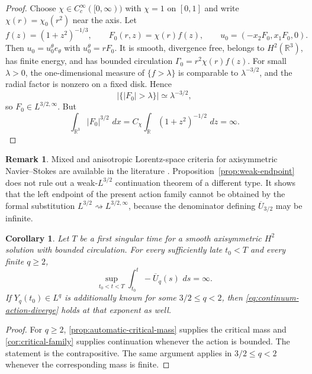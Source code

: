 \documentclass[11pt]{article}
\numberwithin{equation}{section}
\newtheorem{corollary}[corollary]{Corollary}
\theoremstyle{definition}
\newtheorem{remark}[remark]{Remark}
\newcommand{\R}{\mathbb R}
\newcommand{\dd}{\,d}
\begin{document}
\begin{proof}
Choose $\chi\in C_c^\infty([0,\infty))$ with $\chi=1$ on $[0,1]$ and write $\chi(r)=\chi_0(r^2)$ near the axis.  Let
\[
 f(z)=(1+z^2)^{-1/3},
 \qquad
 F_0(r,z)=\chi(r)f(z),
 \qquad
 u_0=(-x_2F_0,x_1F_0,0).
\]
Then $u_0=u_0^\theta e_\theta$ with $u_0^\theta=rF_0$.  It is smooth, divergence free, belongs to $H^2(\R^3)$, has finite energy, and has bounded circulation $\Gamma_0=r^2\chi(r)f(z)$.  For small $\lambda>0$, the one-dimensional measure of $\{f>\lambda\}$ is comparable to $\lambda^{-3/2}$, and the radial factor is nonzero on a fixed disk.  Hence
\[
 |\{|F_0|>\lambda\}|\simeq\lambda^{-3/2},
\]
so $F_0\in L^{3/2,\infty}$.  But
\[
 \int_{\R^3}|F_0|^{3/2}\,\dd x
 =C_\chi\int_\R(1+z^2)^{-1/2}\,\dd z=\infty.
\]
\end{proof}

\begin{remark}\label{rem:lorentz-scope}
Mixed and anisotropic Lorentz-space criteria for axisymmetric Navier--Stokes are available in the literature \cite{WangHuangWeiYu2024}.  Proposition~\ref{prop:weak-endpoint} does not rule out a weak-$L^{3/2}$ continuation theorem of a different type.  It shows that the left endpoint of the present action family cannot be obtained by the formal substitution $L^{3/2}\rightsquigarrow L^{3/2,\infty}$, because the denominator defining $\overline U_{3/2}$ may be infinite.
\end{remark}

\begin{corollary}\label{cor:continuum-necessary-action}
Let $T$ be a first singular time for a smooth axisymmetric $H^2$ solution with bounded circulation.  For every sufficiently late $t_0<T$ and every finite $q\ge2$,
\begin{equation}\label{eq:continuum-action-diverge}
 \sup_{t_0<t<T}\int_{t_0}^t-\overline U_q(s)\,\dd s=\infty.
\end{equation}
If $Y_q(t_0)\in L^q$ is additionally known for some $3/2\le q<2$, then \eqref{eq:continuum-action-diverge} holds at that exponent as well.
\end{corollary}

\begin{proof}
For $q\ge2$, \cref{prop:automatic-critical-mass} supplies the critical mass and \cref{cor:critical-family} supplies continuation whenever the action is bounded.  The statement is the contrapositive.  The same argument applies in $3/2\le q<2$ whenever the corresponding mass is finite.
\end{proof}
\end{document}
